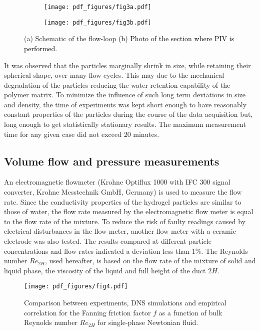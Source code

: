 \documentclass{jfm}
\def\sz#1{{\textcolor{black}{#1}}}
\begin{document}
\begin{figure}
\centering
\begin{subfigure}{.45\textwidth}
  \centering
  \texttt{[image: pdf\_figures/fig3a.pdf]}
  \caption{}
  \label{fig:Set-up schematic}
\end{subfigure}%
\begin{subfigure}{.45\textwidth}
  \centering
  \texttt{[image: pdf\_figures/fig3b.pdf]}
  \caption{}
  \label{fig:PIV set-up}
\end{subfigure}
\caption{(a) Schematic of the flow-loop \sz{(b) Photo of the section where PIV is performed.}}
\label{fig:Set-up}
\end{figure}

It was observed that the particles marginally shrink in size, while retaining their spherical shape, over many flow cycles. This may due to the mechanical degradation of the particles reducing the water retention capability of the polymer matrix. To minimize the influence of such long term deviations in size and density, the time of experiments was kept short enough to have reasonably constant properties of the particles during the course of the data acquisition but, long enough to get statistically stationary results. The maximum measurement time for any given case did not exceed 20 minutes.

\subsection{Volume flow and pressure measurements}\label{sec:Flow and pressure measurement technique}
An electromagnetic flowmeter (Krohne Optiflux 1000 with IFC 300 signal converter, Krohne Messtechnik GmbH, Germany) is used to measure the flow rate. 
Since the conductivity properties of the hydrogel particles are similar to those of  water, 
the flow rate measured by the electromagnetic flow meter is equal to the flow rate of the mixture. To reduce the risk of faulty readings caused by electrical disturbances in the flow meter, another flow meter with a ceramic electrode was also tested. The results  compared at different particle concentrations and flow rates indicated a deviation less than 1\%. The Reynolds number $Re_{2H}$, used hereafter, is based on the flow rate of the mixture of solid and liquid phase, the viscosity of the liquid and full height of the duct $2H$.

\begin{figure}
\centering
  \texttt{[image: pdf\_figures/fig4.pdf]}
\caption{Comparison between experiments, DNS simulations and empirical correlation for the Fanning friction factor $f$ as a function of bulk Reynolds number $Re_{2H}$ for single-phase Newtonian fluid. }
\label{fig:Friction factor plot}
\end{figure}
\end{document}
